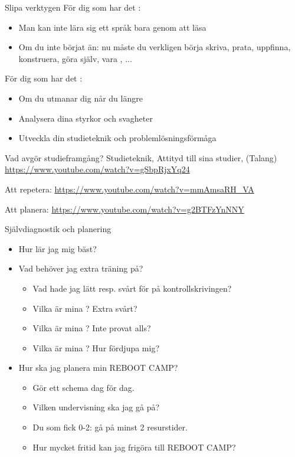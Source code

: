 \begin{Slide}{Slipa verktygen}
För dig som har det :
\begin{itemize}
\item Man kan inte lära sig ett språk bara genom att  läsa
\item Om du inte börjat än: nu måste du verkligen börja skriva, prata, uppfinna, konstruera, göra själv, vara , ...
\end{itemize}
För dig som har det :
\begin{itemize}
\item Om du utmanar dig når du  längre
\item Analysera dina styrkor och svagheter
\item Utveckla din studieteknik och problemlösningsförmåga
\end{itemize}
\end{Slide}

\begin{Slide}{Vad avgör studieframgång?}
Studieteknik, Attityd till sina studier, (Talang)
\url{https://www.youtube.com/watch?v=gSbpRjxYq24}

\vspace{2em} Att repetera:
\url{https://www.youtube.com/watch?v=mmAmsaRH_VA}

\vspace{2em} Att planera:
\url{https://www.youtube.com/watch?v=g2BTFzYnNNY}
\end{Slide}

\begin{Slide}{Självdiagnostik och planering}
\begin{itemize}
\item Hur lär jag mig bäst?
\item Vad behöver jag extra träning på?
\begin{itemize}
\item Vad hade jag lätt resp. svårt för på kontrollskrivingen?
\item Vilka är mina ? Extra svårt?
\item Vilka är mina ? Inte provat alls?
\item Vilka är mina ? Hur fördjupa mig?
\end{itemize}
\item Hur ska jag planera min REBOOT CAMP?
\begin{itemize}
\item Gör ett schema dag för dag. 
\item Vilken undervisning ska jag gå på?
\item Du som fick 0-2: gå på minst 2 resurstider. 
\item Hur mycket fritid kan jag frigöra till REBOOT CAMP?
\end{itemize}
\end{itemize}
\end{Slide}



